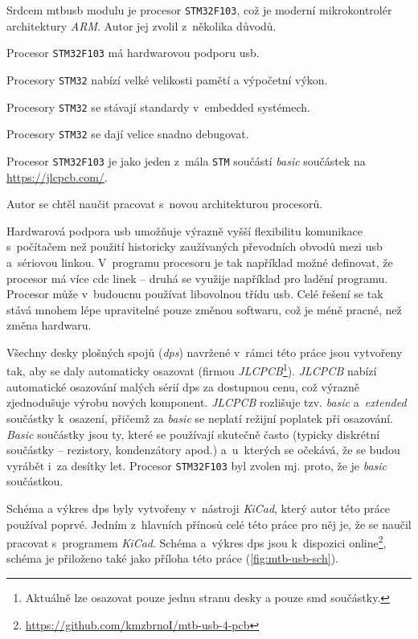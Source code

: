 Srdcem \gls{mtbusb} modulu je procesor \texttt{STM32F103}, což je moderní
mikrokontrolér architektury \textit{ARM}. Autor jej zvolil z~několika důvodů.

\newpage
\begin{compactenum}
\item Procesor \texttt{STM32F103} má hardwarovou podporu \gls{usb}.
\item Procesory \texttt{STM32} nabízí velké velikosti pamětí a výpočetní výkon.
\item Procesory \texttt{STM32} se stávají standardy v~embedded systémech.
\item Procesory \texttt{STM32} se dají velice snadno debugovat.
\item Procesor \texttt{STM32F103} je jako jeden z~mála \texttt{STM} součástí
	\textit{basic} součástek na \url{https://jlcpcb.com/}.
\item Autor se chtěl naučit pracovat s~novou architekturou procesorů.
\end{compactenum}

Hardwarová podpora \gls{usb} umožňuje výrazně vyšší flexibilitu komunikace
s~počítačem než použití historicky zaužívaných převodních obvodů mezi
\gls{usb} a~sériovou linkou. V~programu procesoru je tak například
možné definovat, že procesor má více \gls{cdc} linek – druhá se využije například
pro ladění programu. Procesor může v~budoucnu používat libovolnou třídu
\gls{usb}. Celé řešení se tak stává mnohem lépe upravitelné pouze změnou
softwaru, což je méně pracné, než změna hardwaru.

Všechny desky plošných spojů (\textit{\gls{dps}}) navržené v~rámci této práce
jsou vytvořeny tak, aby se daly automaticky osazovat (firmou
\textit{JLCPCB}\footnote{Aktuálně lze osazovat pouze jednu stranu
desky a pouze \gls{smd} součástky.}). \textit{JLCPCB} nabízí automatické osazování
malých sérií \gls{dps} za dostupnou cenu, což výrazně zjednodušuje výrobu nových
komponent. \textit{JLCPCB} rozlišuje tzv. \textit{basic} a~\textit{extended}
součástky k~osazení, přičemž za \textit{basic} se neplatí režijní poplatek při
osazování. \textit{Basic} součástky jsou ty, které se používají skutečně často
(typicky diskrétní součástky – rezistory, kondenzátory apod.) a~u~kterých se
očekává, že se budou vyrábět i~za desítky let. Procesor \texttt{STM32F103} byl
zvolen mj. proto, že je \textit{basic} součástkou.

Schéma a výkres \gls{dps} byly vytvořeny v~nástroji \textit{KiCad},
který autor této práce používal poprvé. Jedním z~hlavních přínosů celé této
práce pro něj je, že se naučil pracovat s~programem \textit{KiCad}. Schéma
a~výkres \gls{dps} jsou k~dispozici
online\footnote{\url{https://github.com/kmzbrnoI/mtb-usb-4-pcb}}, schéma je
přiloženo také jako příloha této práce (\ref{fig:mtb-usb-sch}).


